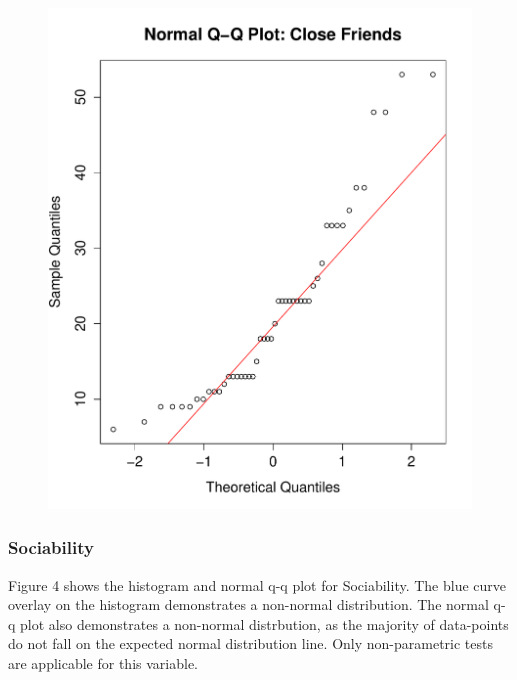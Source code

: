 \begin{figure}[H]
\includegraphics[scale=0.35]{./img/qqplot_closefriends.pdf}
\end{figure}

\subsubsection{Sociability}

Figure 4 shows the histogram and normal q-q plot for Sociability. The blue curve overlay on the histogram demonstrates a non-normal distribution. The normal q-q plot also demonstrates a non-normal distrbution, as the majority of data-points do not fall on the expected normal distribution line. Only non-parametric tests are applicable for this variable.

